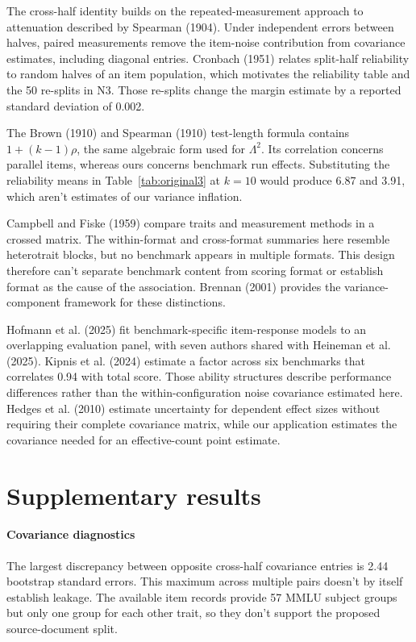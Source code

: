 The cross-half identity builds on the repeated-measurement approach to attenuation described by Spearman (1904). Under independent errors between halves, paired measurements remove the item-noise contribution from covariance estimates, including diagonal entries. Cronbach (1951) relates split-half reliability to random halves of an item population, which motivates the reliability table and the 50 re-splits in N3. Those re-splits change the margin estimate by a reported standard deviation of 0.002.

The Brown (1910) and Spearman (1910) test-length formula contains $1+(k-1)\rho$, the same algebraic form used for $\Lambda^2$. Its correlation concerns parallel items, whereas ours concerns benchmark run effects. Substituting the reliability means in Table~\ref{tab:original3} at $k=10$ would produce 6.87 and 3.91, which aren't estimates of our variance inflation.

Campbell and Fiske (1959) compare traits and measurement methods in a crossed matrix. The within-format and cross-format summaries here resemble heterotrait blocks, but no benchmark appears in multiple formats. This design therefore can't separate benchmark content from scoring format or establish format as the cause of the association. Brennan (2001) provides the variance-component framework for these distinctions.

Hofmann et al. (2025) fit benchmark-specific item-response models to an overlapping evaluation panel, with seven authors shared with Heineman et al. (2025). Kipnis et al. (2024) estimate a factor across six benchmarks that correlates 0.94 with total score. Those ability structures describe performance differences rather than the within-configuration noise covariance estimated here. Hedges et al. (2010) estimate uncertainty for dependent effect sizes without requiring their complete covariance matrix, while our application estimates the covariance needed for an effective-count point estimate.

\section{Supplementary results}
\label{app:supplementary}

\paragraph{Covariance diagnostics}
The largest discrepancy between opposite cross-half covariance entries is 2.44 bootstrap standard errors. This maximum across multiple pairs doesn't by itself establish leakage. The available item records provide 57 MMLU subject groups but only one group for each other trait, so they don't support the proposed source-document split.

